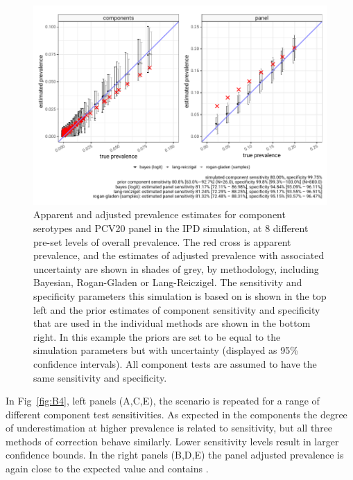 \documentclass[a4paper, 12pt, twoside]{article}
\begin{document}
\begin{figure}[h!]
\centering
  \includegraphics{vignettes/latex/s2/fig/simulation_result_sens_80_80_v2}
  \caption{Apparent and adjusted prevalence estimates for component serotypes and PCV20 panel in the IPD simulation, at 8 different pre-set levels of overall prevalence. The red cross is apparent prevalence, and the estimates of adjusted prevalence with associated uncertainty are shown in shades of grey, by methodology, including Bayesian, Rogan-Gladen or Lang-Reiczigel. The sensitivity and specificity parameters this simulation is based on is shown in the top left and the prior estimates of component sensitivity and specificity that are used in the individual methods are shown in the bottom right. In this example the priors are set to be equal to the simulation parameters but with uncertainty (displayed as 95\% confidence intervals). All component tests are assumed to have the same sensitivity and specificity.}
\label{fig:B3}
\end{figure}

In Fig~\ref{fig:B4}, left panels (A,C,E), the scenario is repeated for a range of different component test sensitivities. As expected in the components the degree of underestimation at higher prevalence is related to sensitivity, but all three methods of correction behave similarly. Lower sensitivity levels result in larger confidence bounds. In the right panels (B,D,E) the panel adjusted prevalence is again close to the expected value and contains .
\end{document}
